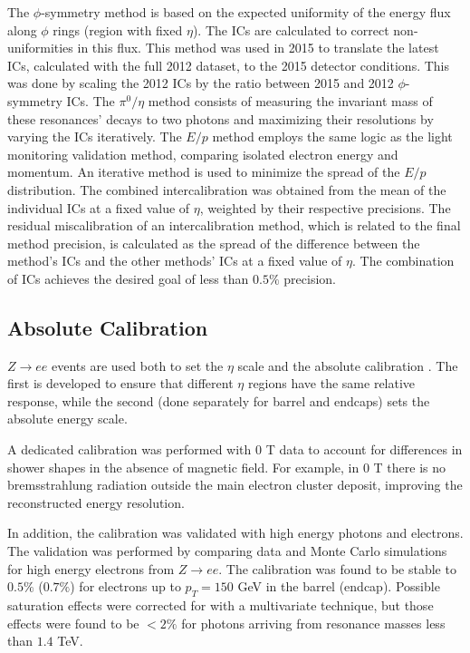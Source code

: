 The $\phi$-symmetry method is based on the expected uniformity of the energy flux along $\phi$ rings (region with fixed $\eta$). The ICs are calculated to correct non-uniformities in this flux. This method was used in 2015 to translate the latest ICs, calculated with the full 2012 dataset, to the 2015 detector conditions. This was done by scaling the 2012 ICs by the ratio between 2015 and 2012 $\phi$-symmetry ICs.
The $\pi^0/\eta$ method consists of measuring the invariant mass of these resonances' decays to two photons and maximizing their resolutions by varying the ICs iteratively. %
The $E/p$ method employs the same logic as the light monitoring validation method, comparing isolated electron energy and momentum. An iterative method is used to minimize the spread of the $E/p$ distribution.
The combined intercalibration was obtained from the mean of the individual ICs at a fixed value of $\eta$, weighted by their respective precisions. The residual miscalibration of an intercalibration method, which is related to the final method precision, is calculated as the spread of the difference between the method's ICs and the other methods' ICs at a fixed value of $\eta$. 
The combination of ICs achieves the desired goal of less than $0.5\%$ precision.%


\subsection{Absolute Calibration}

$Z\rightarrow ee$ events are used both to set the $\eta$ scale and the absolute calibration \cite{calibration}. The first is developed to ensure that  different $\eta$ regions have the same relative response, while the second (done separately for barrel and endcaps) sets the absolute energy scale.

A dedicated calibration was performed with 0 T data to account for differences in shower shapes in the absence of magnetic field. For example, in 0 T there is no bremsstrahlung radiation outside the main electron cluster deposit, improving the reconstructed energy resolution.

In addition, the calibration was validated with high energy photons and electrons.
The validation was performed by comparing data and Monte Carlo simulations for high energy electrons from $Z\rightarrow ee$. The calibration was found to be stable to $0.5\%$ ($0.7\%$) for electrons up to $p_{T}=150$ GeV in the barrel (endcap). Possible saturation effects were corrected for with a multivariate technique, but those effects were found to be $<2\%$ for photons arriving from resonance masses less than $1.4$ TeV.

